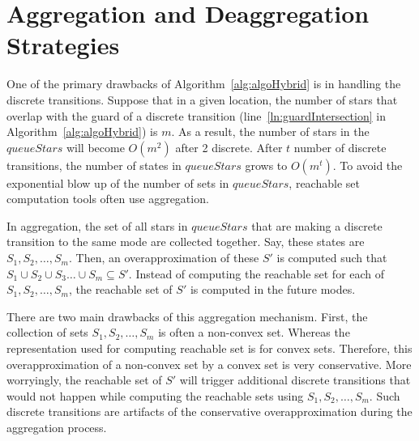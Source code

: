 \section{Aggregation and Deaggregation Strategies}
\label{sec:agdag}

One of the primary drawbacks of Algorithm~\ref{alg:algoHybrid} is in handling the discrete transitions. 
%
Suppose that in a given location, the number of stars that overlap with the guard of a discrete transition (line~\ref{ln:guardIntersection} in Algorithm~\ref{alg:algoHybrid}) is $m$.
%
As a result, the number of stars in the $queueStars$ will become $O(m^2)$ after 2 discrete. After $t$ number of discrete transitions, the number of states in $queueStars$ grows to $O(m^t)$.
%
To avoid the exponential blow up of the number of sets in $queueStars$, reachable set computation tools often use aggregation.

In aggregation, the set of all stars in $queueStars$ that are making a discrete transition to the same mode are collected together. 
%
Say, these states are $S_1, S_2, \ldots, S_m$.
%
Then, an overapproximation of these $S'$ is computed such that $S_1 \cup S_2 \cup S_3 \ldots \cup S_m \subseteq S'$. 
%
Instead of computing the reachable set for each of $S_1, S_2, \ldots, S_m$, the reachable set of $S'$ is computed in the future modes.

There are two main drawbacks of this aggregation mechanism. 
%
First, the collection of sets $S_1, S_2, \ldots, S_m$ is often a non-convex set. 
%
Whereas the representation used for computing reachable set is for convex sets. 
%
Therefore, this overapproximation of a non-convex set by a convex set is very conservative.
%
More worryingly, the reachable set of $S'$ will trigger additional discrete transitions that would not happen while computing the reachable sets using $S_1, S_2, \ldots, S_m$.
%
Such discrete transitions are artifacts of the conservative overapproximation during the aggregation process.

